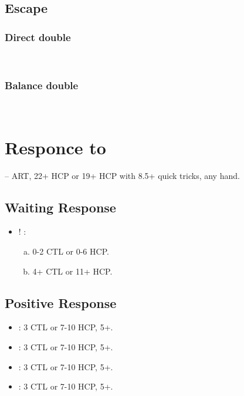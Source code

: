 \documentclass[12pt,twoside,a5paper]{report}%
\begin{document}
	\section*{Escape}
		\subsection*{Direct double}
		\\

		\subsection*{Balance double}
		\\

\chapter*{Responce to }
	-- ART, 22+ HCP or 19+ HCP with 8.5+ quick tricks, any hand.
	\section*{Waiting Response}
		\begin{itemize}
		\renewcommand{\labelitemi}{}
			\item {}! : 
				\begin{enumerate}[(a)]
				\item 0-2 CTL or 0-6 HCP.
				\item 4+ CTL or 11+ HCP.
				\end{enumerate}
		\end{itemize}

	\section*{Positive Response}
		\begin{itemize}
		\renewcommand{\labelitemi}{}
			\item {} : 3 CTL or 7-10 HCP, 5+\he{}.
			\item {} : 3 CTL or 7-10 HCP, 5+\sp{}.
			\item {} : 3 CTL or 7-10 HCP, 5+\cl{}.
			\item {} : 3 CTL or 7-10 HCP, 5+\di{}.
		\end{itemize}
\end{document}
